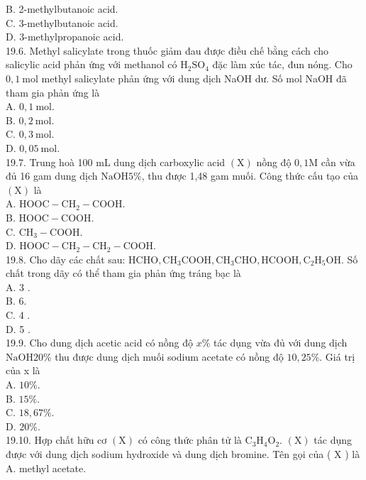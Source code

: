 \documentclass[10pt]{article}
\begin{document}
B. 2-methylbutanoic acid.\\
C. 3-methylbutanoic acid.\\
D. 3-methylpropanoic acid.\\
19.6. Methyl salicylate trong thuốc giảm đau được điều chế bằng cách cho salicylic acid phản ứng với methanol có $\mathrm{H}_{2} \mathrm{SO}_{4}$ đặc làm xúc tác, đun nóng. Cho $0,1 \mathrm{~mol}$ methyl salicylate phản ứng với dung dịch NaOH dư. Số mol NaOH đã tham gia phản ứng là\\
A. $0,1 \mathrm{~mol}$.\\
B. $0,2 \mathrm{~mol}$.\\
C. $0,3 \mathrm{~mol}$.\\
D. $0,05 \mathrm{~mol}$.\\
19.7. Trung hoà 100 mL dung dịch carboxylic acid $(\mathrm{X})$ nồng độ $0,1 \mathrm{M}$ cần vừa đủ 16 gam dung dịch $\mathrm{NaOH} 5 \%$, thu được 1,48 gam muối. Công thức cấu tạo của $(\mathrm{X})$ là\\
A. $\mathrm{HOOC}-\mathrm{CH}_{2}-\mathrm{COOH}$.\\
B. $\mathrm{HOOC}-\mathrm{COOH}$.\\
C. $\mathrm{CH}_{3}-\mathrm{COOH}$.\\
D. $\mathrm{HOOC}-\mathrm{CH}_{2}-\mathrm{CH}_{2}-\mathrm{COOH}$.\\
19.8. Cho dãy các chất sau: $\mathrm{HCHO}, \mathrm{CH}_{3} \mathrm{COOH}, \mathrm{CH}_{3} \mathrm{CHO}, \mathrm{HCOOH}, \mathrm{C}_{2} \mathrm{H}_{5} \mathrm{OH}$. Số chất trong dãy có thể tham gia phản ứng tráng bạc là\\
A. 3 .\\
B. 6.\\
C. 4 .\\
D. 5 .\\
19.9. Cho dung dịch acetic acid có nồng độ $x \%$ tác dụng vừa đủ với dung dịch $\mathrm{NaOH} 20 \%$ thu được dung dịch muối sodium acetate có nồng độ $10,25 \%$. Giá trị của x là\\
A. $10 \%$.\\
B. $15 \%$.\\
C. $18,67 \%$.\\
D. $20 \%$.\\
19.10. Hợp chất hữu cơ $(\mathrm{X})$ có công thức phân tử là $\mathrm{C}_{3} \mathrm{H}_{4} \mathrm{O}_{2}$. $(\mathrm{X})$ tác dụng được với dung dịch sodium hydroxide và dung dịch bromine. Tên gọi của ( X ) là\\
A. methyl acetate.\\
\end{document}
